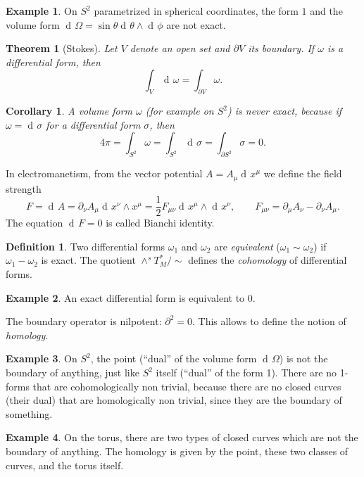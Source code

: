 \documentclass[a4paper,12pt]{book}
\newcommand{\dd}{\mathop{\mathrm{d}\!}{}}
\newtheorem{theorem}{Theorem}
\newtheorem{corollary}{Corollary}[theorem]
\theoremstyle{definition}
\newtheorem{definition}{Definition}
\newtheorem{example}{Example}
\theoremstyle{remark}
\begin{document}
\begin{example}
On $S^2$ parametrized in spherical coordinates, the form $1$ and the volume form $\dd\Omega=\sin\theta\dd\theta\wedge\dd\phi$ are not exact.
\end{example}

\begin{theorem}[Stokes]
Let $V$ denote an open set and $\partial V$ its boundary. If $\omega$ is a differential form, then
\[\int_V\dd\omega=\int_{\partial V}\omega.\]
\end{theorem}

\begin{corollary}
A volume form $\omega$ (for example on $S^2$) is never exact, because if $\omega=\dd\sigma$ for a differential form $\sigma$, then
\[4\pi=\int_{S^2}\omega=\int_{S^2}\dd\sigma=\int_{\partial S^2}\sigma=0.\]
\end{corollary}

In electromanetism, from the vector potential $A=A_\mu\dd x^\mu$ we define the field strength
\[F=\dd A=\partial_\nu A_\mu\dd x^\nu\wedge x^\mu=\frac{1}{2}F_{\mu\nu}\dd x^\mu\wedge\dd x^\nu,\qquad F_{\mu\nu}=\partial_\mu A_\nu-\partial_\nu A_\mu.\]
The equation $\dd F=0$ is called Bianchi identity.

\begin{definition}
Two differential forms $\omega_1$ and $\omega_2$ are \emph{equivalent} ($\omega_1\sim\omega_2$) if $\omega_1-\omega_2$ is exact. The quotient $\wedge^s T_M^*/\sim$ defines the \emph{cohomology} of differential forms.
\end{definition}

\begin{example}
An exact differential form is equivalent to 0.
\end{example}

The boundary operator is nilpotent: $\partial^2=0$. This allows to define the notion of \emph{homology}.

\begin{example}
On $S^2$, the point (``dual'' of the volume form $\dd\Omega$) is not the boundary of anything, just like $S^2$ itself (``dual'' of the form 1). There are no 1-forms that are cohomologically non trivial, because there are no closed curves (their dual) that are homologically non trivial, since they are the boundary of something.
\end{example}

\begin{example}
On the torus, there are two types of closed curves which are not the boundary of anything. The homology is given by the point, these two classes of curves, and the torus itself.
\end{example}
\end{document}
